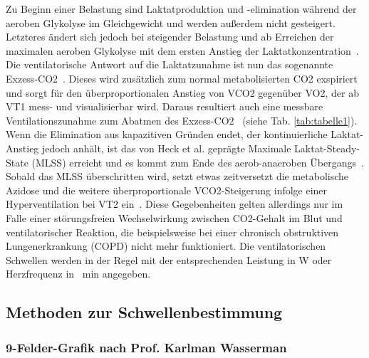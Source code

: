 Zu Beginn einer Belastung sind Laktatproduktion und -elimination während der aeroben Glykolyse im Gleichgewicht und werden außerdem nicht gesteigert. Letzteres ändert sich jedoch bei steigender Belastung und ab Erreichen der maximalen aeroben Glykolyse mit dem ersten Anstieg der Laktatkonzentration~\cite{Antonutto.1995}. Die ventilatorische Antwort auf die Laktatzunahme ist nun das sogenannte Exzess-\acs{CO2}~\cite{Westhoff.2012}. Dieses wird zusätzlich zum normal metabolisierten \acs{CO2} exspiriert und sorgt für den überproportionalen Anstieg von \acs{VCO2} gegenüber \acs{VO2}, der ab VT1 mess- und visualisierbar wird. Daraus resultiert auch eine messbare Ventilationszunahme zum Abatmen des Exzess-\acs{CO2}~\cite{Kroidl.2015} (siehe Tab. \ref{tab:tabelle1}). Wenn die Elimination aus kapazitiven Gründen endet, der kontinuierliche Laktat-Anstieg jedoch anhält, ist das von Heck et al. geprägte Maximale Laktat-Steady-State (\acs{MLSS}) erreicht und es kommt zum Ende des aerob-anaeroben Übergangs~\cite{Heck.1985}. Sobald das \acs{MLSS} überschritten wird, setzt etwas zeitversetzt die metabolische Azidose und die weitere überproportionale \acs{VCO2}-Steigerung infolge einer Hyperventilation bei VT2 ein~\cite{Kroidl.2015}. Diese Gegebenheiten gelten allerdings nur im Falle einer störungsfreien Wechselwirkung zwischen \acs{CO2}-Gehalt im Blut und ventilatorischer Reaktion, die beispielsweise bei einer chronisch obstruktiven Lungenerkrankung (\acs{COPD}) nicht mehr funktioniert. Die ventilatorischen Schwellen werden in der Regel mit der entsprechenden Leistung in \si{\watt} oder Herzfrequenz in \si{\per\minute} angegeben.

\subsection{Methoden zur Schwellenbestimmung}

\subsubsection{9-Felder-Grafik nach Prof. Karlman Wasserman}

